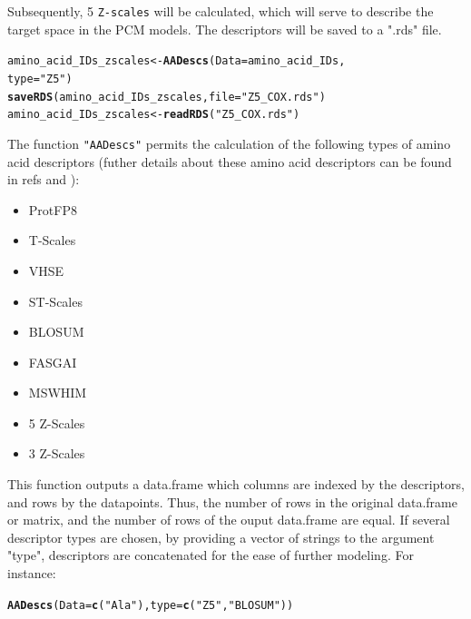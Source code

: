 \documentclass[twoside,a4wide,12pt]{article}\usepackage[]{graphicx}\usepackage[]{color}
\makeatletter
\newcommand{\hlstr}[1]{\textcolor[rgb]{0.192,0.494,0.8}{#1}}%
\newcommand{\hlstd}[1]{\textcolor[rgb]{0.345,0.345,0.345}{#1}}%
\newcommand{\hlkwb}[1]{\textcolor[rgb]{0.69,0.353,0.396}{#1}}%
\newcommand{\hlkwc}[1]{\textcolor[rgb]{0.333,0.667,0.333}{#1}}%
\newcommand{\hlkwd}[1]{\textcolor[rgb]{0.737,0.353,0.396}{\textbf{#1}}}%
\newenvironment{kframe}{%
 \def\at@end@of@kframe{}%
 \ifinner\ifhmode%
  \def\at@end@of@kframe{\end{minipage}}%
  \begin{minipage}{\columnwidth}%
 \fi\fi%
 \def\FrameCommand##1{\hskip\@totalleftmargin \hskip-\fboxsep
 \colorbox{shadecolor}{##1}\hskip-\fboxsep
     \hskip-\linewidth \hskip-\@totalleftmargin \hskip\columnwidth}%
 \MakeFramed {\advance\hsize-\width
   \@totalleftmargin\z@ \linewidth\hsize
   \@setminipage}}%
 {\par\unskip\endMakeFramed%
 \at@end@of@kframe}
\newenvironment{knitrout}{}{} %
\makeatother
\begin{document}
Subsequently, 5 \verb|Z-scales| will be calculated, which will serve to describe the target space in the PCM models.
The descriptors will be saved to a ".rds" file.
\begin{knitrout}
\color{fgcolor}\begin{kframe}
\begin{alltt}
\hlstd{amino_acid_IDs_zscales} \hlkwb{<-} \hlkwd{AADescs}\hlstd{(}\hlkwc{Data} \hlstd{= amino_acid_IDs,}
    \hlkwc{type} \hlstd{=} \hlstr{"Z5"}\hlstd{)}
\hlkwd{saveRDS}\hlstd{(amino_acid_IDs_zscales,} \hlkwc{file} \hlstd{=} \hlstr{"Z5_COX.rds"}\hlstd{)}
\hlstd{amino_acid_IDs_zscales} \hlkwb{<-} \hlkwd{readRDS}\hlstd{(}\hlstr{"Z5_COX.rds"}\hlstd{)}
\end{alltt}
\end{kframe}
\end{knitrout}




The function \verb|"AADescs"| permits the calculation of the following types of amino acid descriptors (futher details about these amino acid descriptors can be found in refs \cite{AAs1} and \cite{AAs2}):
\begin{itemize}
\item ProtFP8
\item T-Scales
\item VHSE
\item ST-Scales
\item BLOSUM
\item FASGAI
\item MSWHIM
\item 5 Z-Scales
\item 3 Z-Scales
\end{itemize}
This function outputs a data.frame which columns are indexed by the descriptors, and rows by the datapoints. Thus, the number of rows in the original data.frame or matrix, and the number of rows of the ouput data.frame are equal. 
If several descriptor types are chosen, by providing a vector of strings to the argument "type", descriptors are concatenated for the ease of further modeling. 
For instance: 
\begin{knitrout}
\color{fgcolor}\begin{kframe}
\begin{alltt}
\hlkwd{AADescs}\hlstd{(}\hlkwc{Data} \hlstd{=} \hlkwd{c}\hlstd{(}\hlstr{"Ala"}\hlstd{),} \hlkwc{type} \hlstd{=} \hlkwd{c}\hlstd{(}\hlstr{"Z5"}\hlstd{,} \hlstr{"BLOSUM"}\hlstd{))}
\end{alltt}


{\ttfamily\noindent\color{warningcolor}{\#\# Warning: cannot open compressed file '', probable reason 'No such file or directory'}}

{\ttfamily\noindent\bfseries\color{errorcolor}{\#\# Error: cannot open the connection}}\end{kframe}
\end{knitrout}
\end{document}
